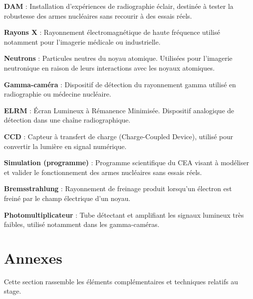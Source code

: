 \documentclass[12pt,a4paper]{report}
\begin{document}
\textbf{DAM} : Installation d’expériences de radiographie éclair, destinée à tester la robustesse des armes nucléaires sans recourir à des essais réels.

\textbf{Rayons X} : Rayonnement électromagnétique de haute fréquence utilisé notamment pour l’imagerie médicale ou industrielle.

\textbf{Neutrons} : Particules neutres du noyau atomique. Utilisées pour l’imagerie neutronique en raison de leurs interactions avec les noyaux atomiques.

\textbf{Gamma-caméra} : Dispositif de détection du rayonnement gamma utilisé en radiographie ou médecine nucléaire.

\textbf{ELRM} : Écran Lumineux à Rémanence Minimisée. Dispositif analogique de détection dans une chaîne radiographique.
 
\textbf{CCD} : Capteur à transfert de charge (Charge-Coupled Device), utilisé pour convertir la lumière en signal numérique.

\textbf{Simulation (programme)} : Programme scientifique du CEA visant à modéliser et valider le fonctionnement des armes nucléaires sans essais réels.

\textbf{Bremsstrahlung} : Rayonnement de freinage produit lorsqu’un électron est freiné par le champ électrique d’un noyau.

\textbf{Photomultiplicateur} : Tube détectant et amplifiant les signaux lumineux très faibles, utilisé notamment dans les gamma-caméras.



\appendix
\chapter{Annexes}

Cette section rassemble les éléments complémentaires et techniques relatifs au stage.
\end{document}

